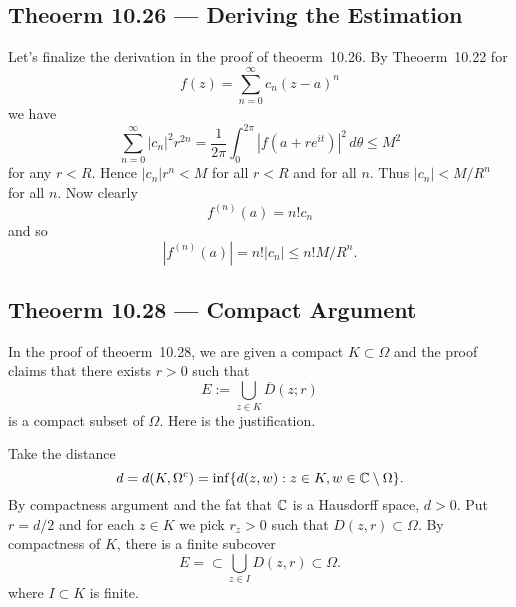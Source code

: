\subsection{Theoerm 10.26 --- Deriving the Estimation}

Let's finalize the derivation in the proof of theoerm~10.26.
By Theoerm~10.22 for
\begin{equation*}
f(z) = \sum_{n=0}^\infty c_n(z-a)^n
\end{equation*}
we have
\begin{equation*}
\sum_{n=0}^\infty |c_n|^2 r^{2n}
= \frac{1}{2\pi}\int_0^{2\pi} \left|f(a+re^{it})\right|^2\,d\theta \leq M^2
\end{equation*}
for any \(r<R\). Hence \(|c_n|r^n < M\) for all \(r<R\) and for all $n$.
Thus \(|c_n| < M/R^n\) for all $n$. Now clearly
\begin{equation*}
f^{(n)}(a) = n!c_n
\end{equation*}
and so
\begin{equation*}
\left|f^{(n)}(a)\right| = n!|c_n| \leq n!M/R^n.
\end{equation*}


\subsection{Theoerm 10.28 --- Compact Argument}

In the proof of theoerm~10.28, we are given a compact \(K \subset \Omega\)
and the proof claims that there exists \(r>0\) such that
\begin{equation*}
E := \bigcup_{z\in K} \overline{D}(z;r)
\end{equation*}
is a compact subset of \(\Omega\).
Here is the justification.

Take the distance 
\begin{equation*}
d=d(K,\Omega^c)=\inf\{d(z,w):z\in K, w\in \mathbb{C}\setminus\Omega\}.
\end{equation*}
By compactness argument and the fat that \(\mathbb{C}\) is a Hausdorff space, \(d>0\).
Put \(r=d/2\) and
for each \(z\in K\) we pick \(r_z>0\) such that \(D(z,r) \subset \Omega\).
By compactness of $K$, there is a finite subcover
\begin{equation*}
E = \subset \bigcup_{z\in I} D(z,r) \subset \Omega.
\end{equation*}
where \(I\subset K\) is finite.


